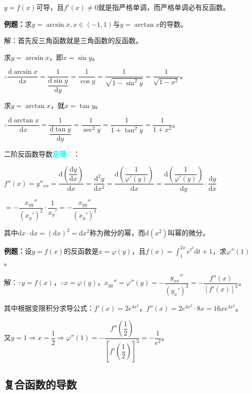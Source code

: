\documentclass[UTF8, 12pt]{ctexart}
\begin{document}
        $y=f(x)$可导，且$f'(x)\neq 0$就是指严格单调，而严格单调必有反函数。

        \textbf{例题：}求$y=\arcsin x,x\in(-1,1)$与$y=\arctan x$的导数。

        解：首先反三角函数就是三角函数的反函数。

        求$y=\arcsin x$，即$x=\sin y$。\medskip

        $\therefore\dfrac{\textrm{d}\arcsin x}{\textrm{d}x}=\dfrac{1}{\dfrac{\textrm{d}\sin y}{\textrm{d}y}}=\dfrac{1}{\cos y}=\dfrac{1}{\sqrt{1-\sin^2y}}=\dfrac{1}{\sqrt{1-x^2}}$。\medskip

        求$y=\arctan x$，就$x=\tan y$。\medskip

        $\therefore\dfrac{\textrm{d}\arctan x}{\textrm{d}x}=\dfrac{1}{\dfrac{\textrm{d}\tan y}{\textrm{d}y}}=\dfrac{1}{\sec^2y}=\dfrac{1}{1+\tan^2y}=\dfrac{1}{1+x^2}$。\medskip

        二阶反函数导数\textcolor{aqua}{\textbf{定理：}}：\medskip

        $f''(x)=y''_{xx}=\dfrac{\textrm{d}\left(\dfrac{\textrm{d}y}{\textrm{d}x}\right)}{\textrm{d}x}=\dfrac{\textrm{d}^2y}{\textrm{d}x^2}=\dfrac{\textrm{d}\left(\dfrac{1}{\varphi'(y)}\right)}{\textrm{d}x}=\dfrac{\textrm{d}\left(\dfrac{1}{\varphi'(y)}\right)}{\textrm{d}y}\cdot\dfrac{\textrm{d}y}{\textrm{d}x}$

        $=-\dfrac{x_{yy}''}{(x_y')^2}\cdot\dfrac{1}{x_y'}=-\dfrac{x_{yy}''}{(x_y')^3}$\medskip

        其中$\textrm{d}x\cdot\textrm{d}x=(\textrm{d}x)^2=\textrm{d}x^2$称为微分的幂，而$\textrm{d}(x^2)$叫幂的微分。

        \textbf{例题：}设$y=f(x)$的反函数是$x=\varphi(y)$，且$f(x)=\int_1^{2x}e^{t^2}\textrm{d}t+1$，求$\varphi''(1)$。

        解：$\because y=f(x)$，$\therefore x=\varphi(y)$，$x_{yy}''=\varphi''(y)=-\dfrac{y_{xx}''}{(y_x')^3}=-\dfrac{f''(x)}{[f'(x)]^3}$。\medskip

        其中根据变限积分求导公式：$f'(x)=2e^{4x^2}$，$f''(x)=2e^{4x^2}\cdot 8x=16xe^{4x^2}$。\medskip

        又$y=1\Rightarrow x=\dfrac{1}{2}\Rightarrow\varphi''(1)=-\dfrac{f''\left(\dfrac{1}{2}\right)}{\left[f'\left(\dfrac{1}{2}\right)\right]^3}=-\dfrac{1}{e^2}$。

        \subsection{复合函数的导数}
\end{document}
